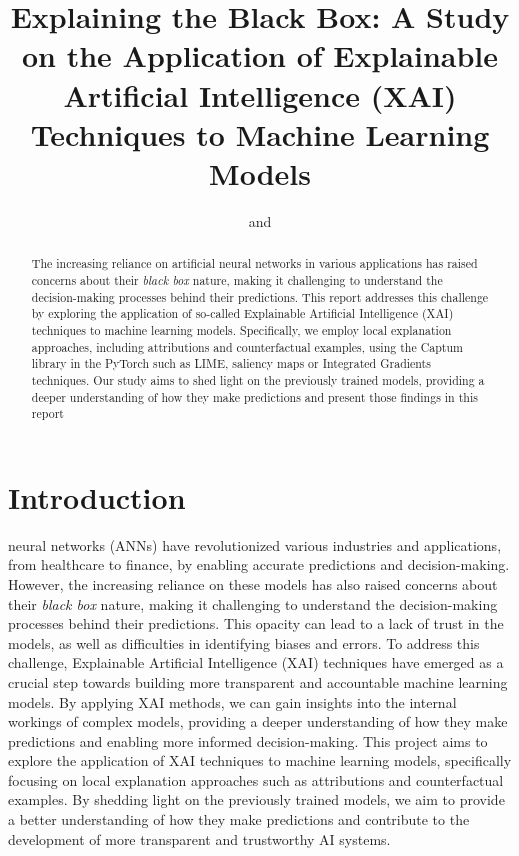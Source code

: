 \documentclass[journal, a4paper]{IEEEtran}
\begin{document}
\title{Explaining the Black Box: A Study on the Application of Explainable Artificial Intelligence (XAI) Techniques to Machine Learning Models}
\author{
    \large
    and
    \\[1ex]
    \normalsize
}


\maketitle

\begin{abstract}
    The increasing reliance on artificial neural networks in various applications has raised concerns about their \textit{black box} nature, making it challenging to understand the decision-making processes behind their predictions.
    This report addresses this challenge by exploring the application of so-called Explainable Artificial Intelligence (XAI) techniques to machine learning models.
    Specifically, we employ local explanation approaches, including attributions and counterfactual examples, using the Captum library in the PyTorch such as LIME, saliency maps or Integrated Gradients techniques.
    Our study aims to shed light on the previously trained models, providing a deeper understanding of how they make predictions and present those findings in this report
\end{abstract}

\section{Introduction}\label{sec:introduction}

 neural networks (ANNs) have revolutionized various industries and applications, from healthcare to finance, by enabling accurate predictions and decision-making.
However, the increasing reliance on these models has also raised concerns about their \textit{black box} nature, making it challenging to understand the decision-making processes behind their predictions.
This opacity can lead to a lack of trust in the models, as well as difficulties in identifying biases and errors.
To address this challenge, Explainable Artificial Intelligence (XAI) techniques have emerged as a crucial step towards building more transparent and accountable machine learning models.
By applying XAI methods, we can gain insights into the internal workings of complex models, providing a deeper understanding of how they make predictions and enabling more informed decision-making.
This project aims to explore the application of XAI techniques to machine learning models, specifically focusing on local explanation approaches such as attributions and counterfactual examples.
By shedding light on the previously trained models, we aim to provide a better understanding of how they make predictions and contribute to the development of more transparent and trustworthy AI systems.
\end{document}

